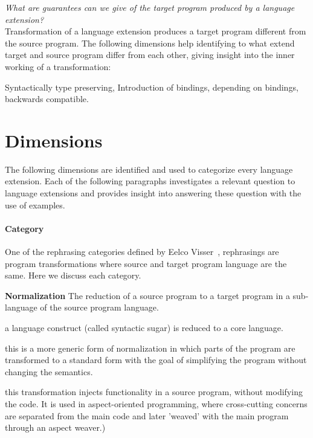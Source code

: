 \textit{What are guarantees can we give of the target program produced by a language extension?}\\
Transformation of a language extension produces a target program different from the source program. The following dimensions help identifying to what extend target and source program differ from each other, giving insight into the inner working of a transformation:

Syntactically type preserving, Introduction of bindings, depending on bindings, backwards compatible.

\section{Dimensions}
The following dimensions are identified and used to categorize every language extension. Each of the following paragraphs investigates a relevant question to language extensions and provides insight into answering these question with the use of examples.

\paragraph{Category}
One of the rephrasing categories defined by Eelco Visser~\cite{Visser2001}, rephrasings are program transformations where source and target program language are the same. Here we discuss each category.

\textbf{Normalization}
The reduction of a source program to a target program in a sub-language of the source program language.

\begin{description}[font=\normalfont,align=right,leftmargin=!, labelwidth=\widthof{{\bfseries Specialization}},labelsep=2em]
	\item[Desugaring] a language construct (called syntactic sugar) is reduced to a core language.
	\item[Simplification] this is a more generic form of normalization in which parts of the program are transformed to a standard form with the goal of simplifying the program without changing the semantics.
	\item[Weaving] this transformation injects functionality in a source program, without modifying the code. It is used in aspect-oriented programming, where cross-cutting concerns are separated from the main code and later 'weaved' with the main program through an aspect weaver.)                                                                                                                                                                              
\end{description}

